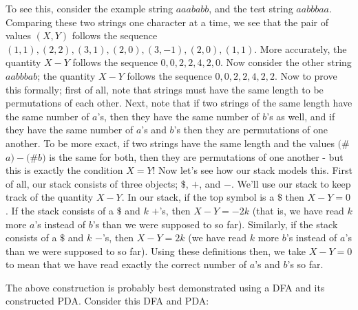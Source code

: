 \documentclass[solution, letterpaper]{cs121}
\begin{document}
\begin{solution}
\indent To see this, consider the example string $aaababb$, and the test string $aabbbaa$.  Comparing these two strings one character at a time, we see that the pair of values $(X,Y)$ follows the sequence $(1, 1), (2, 2), (3, 1), (2, 0), (3, -1), (2, 0), (1, 1)$.  More accurately, the quantity $X - Y$ follows the sequence $0, 0, 2, 2, 4, 2, 0$.  Now consider the other string $aabbbab$; the quantity $X - Y$ follows the sequence $0, 0, 2, 2, 4, 2, 2$.  Now to prove this formally; first of all, note that strings must have the same length to be permutations of each other.  Next, note that if two strings of the same length have the same number of $a$'s, then they have the same number of $b$'s as well, and if they have the same number of $a$'s and $b$'s then they are permutations of one another.  To be more exact, if two strings have the same length and the values $($\#$a) - ($\#$b)$ is the same for both, then they are permutations of one another - but this is exactly the condition $X = Y$!  
\indent Now let's see how our stack models this.  First of all, our stack consists of three objects; $\$$, $+$, and $-$.  We'll use our stack to keep track of the quantity $X - Y$.  In our stack, if the top symbol is a $\$$ then $X - Y = 0$.  If the stack consists of a $\$$ and $k$ $+$'s, then $X - Y = -2k$ (that is, we have read $k$ more $a$'s instead of $b$'s than we were supposed to so far).  Similarly, if the stack consists of a $\$$ and $k$ $-$'s, then $X - Y = 2k$ (we have read $k$ more $b$'s instead of $a$'s than we were supposed to so far).  Using these definitions then, we take $X - Y = 0$ to mean that we have read exactly the correct number of $a$'s and $b$'s so far.

\indent The above construction is probably best demonstrated using a DFA and its constructed PDA.  Consider this DFA and PDA:
\begin{center}

\vspace{0.5cm}

\end{center}
\end{solution}
\end{document}
